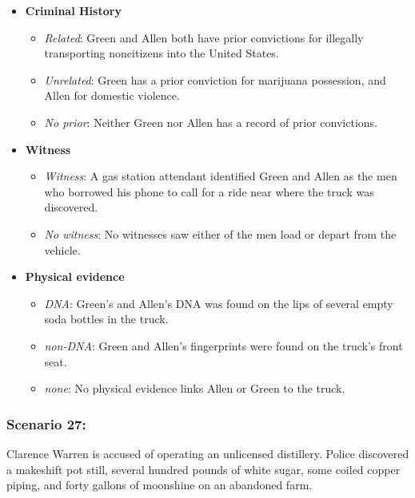 \documentclass[
]{article}
\providecommand{\tightlist}{%
  \setlength{\itemsep}{0pt}\setlength{\parskip}{0pt}}
\begin{document}
\begin{itemize}
\tightlist
\item
  \textbf{Criminal History}

  \begin{itemize}
  \tightlist
  \item
    \emph{Related}: Green and Allen both have prior convictions for
    illegally transporting noncitizens into the United States.
  \item
    \emph{Unrelated}: Green has a prior conviction for marijuana
    possession, and Allen for domestic violence.
  \item
    \emph{No prior}: Neither Green nor Allen has a record of prior
    convictions.
  \end{itemize}
\item
  \textbf{Witness}

  \begin{itemize}
  \tightlist
  \item
    \emph{Witness}: A gas station attendant identified Green and Allen
    as the men who borrowed his phone to call for a ride near where the
    truck was discovered.
  \item
    \emph{No witness}: No witnesses saw either of the men load or depart
    from the vehicle.
  \end{itemize}
\item
  \textbf{Physical evidence}

  \begin{itemize}
  \tightlist
  \item
    \emph{DNA}: Green's and Allen's DNA was found on the lips of several
    empty soda bottles in the truck.
  \item
    \emph{non-DNA}: Green and Allen's fingerprints were found on the
    truck's front seat.
  \item
    \emph{none}: No physical evidence links Allen or Green to the truck.
  \end{itemize}
\end{itemize}

\hypertarget{scenario-27}{%
\subsubsection{Scenario 27:}\label{scenario-27}}

Clarence Warren is accused of operating an unlicensed distillery. Police
discovered a makeshift pot still, several hundred pounds of white sugar,
some coiled copper piping, and forty gallons of moonshine on an
abandoned farm.
\end{document}
